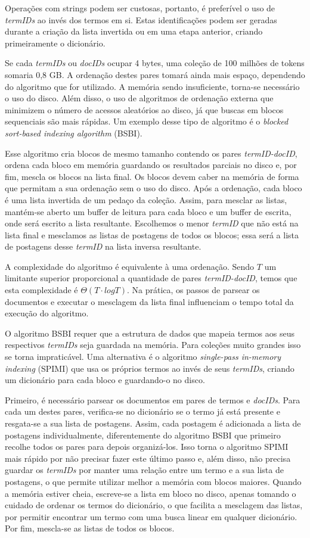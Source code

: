 Operações com strings podem ser custosas, portanto, é preferível o uso de \emph{termIDs} ao invés dos termos em si. Estas identificações podem ser geradas durante a criação da lista invertida ou em uma etapa anterior, criando primeiramente o dicionário.

Se cada \emph{termIDs} ou \emph{docIDs} ocupar 4 bytes, uma coleção de 100 milhões de tokens somaria 0,8 GB. A ordenação destes pares tomará ainda mais espaço, dependendo do algoritmo que for utilizado. A memória sendo insuficiente, torna-se necessário o uso do disco. Além disso, o uso de algoritmos de ordenação externa que minimizem o número de acessos aleatórios ao disco, já que buscas em blocos sequenciais são mais rápidas. Um exemplo desse tipo de algoritmo é o \emph{blocked sort-based indexing algorithm} (BSBI). 

Esse algoritmo cria blocos de mesmo tamanho contendo os pares \emph{termID-docID}, ordena cada bloco em memória guardando os resultados parciais no disco e, por fim, mescla os blocos na lista final. Os blocos devem caber na memória de forma que permitam a sua ordenação sem o uso do disco. Após a ordenação, cada bloco é uma lista invertida de um pedaço da coleção. Assim, para mesclar as listas, mantém-se aberto um buffer de leitura para cada bloco e um buffer de escrita, onde será escrito a lista resultante. Escolhemos o menor \emph{termID} que não está na lista final e mesclamos as listas de postagens de todos os blocos; essa será a lista de postagens desse \emph{termID} na lista inversa resultante. 

A complexidade do algoritmo é equivalente à uma ordenação. Sendo $T$ um limitante superior proporcional a quantidade de pares \emph{termID-docID}, temos que esta complexidade é $\Theta( T \cdot log T )$. Na prática, os passos de parsear os documentos e executar o mesclagem da lista final influenciam o tempo total da execução do algoritmo.

O algoritmo BSBI requer que a estrutura de dados que mapeia termos aos seus respectivos \emph{termIDs} seja guardada na memória. Para coleções muito grandes isso se torna impraticável. Uma alternativa é o algoritmo \emph{single-pass in-memory indexing} (SPIMI) que usa os próprios termos ao invés de seus \emph{termIDs}, criando um dicionário para cada bloco e guardando-o no disco. 

Primeiro, é necessário parsear os documentos em pares de termos e \emph{docIDs}. Para cada um destes pares, verifica-se no dicionário se o termo já está presente e resgata-se a sua lista de postagens. Assim, cada postagem é adicionada a lista de postagens individualmente, diferentemente do algoritmo BSBI que primeiro recolhe todos os pares para depois organizá-los. Isso torna o algoritmo SPIMI mais rápido por não precisar fazer este último passo e, além disso, não precisa guardar os \emph{termIDs} por manter uma relação entre um termo e a sua lista de postagens, o que permite utilizar melhor a memória com blocos maiores. Quando a memória estiver cheia, escreve-se a lista em bloco no disco, apenas tomando o cuidado de ordenar os termos do dicionário, o que facilita a mesclagem das listas, por permitir encontrar um termo com uma busca linear em qualquer dicionário. Por fim, mescla-se as listas de todos os blocos. 


